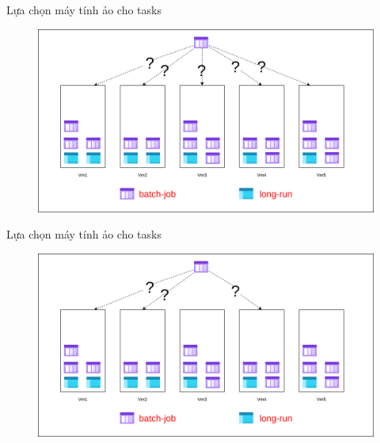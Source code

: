 \documentclass[11pt,xcolor={dvipsnames}, aspectratio=169]{beamer}
\begin{document}
\begin{frame}
{Lựa chọn máy tính ảo cho tasks}
	\begin{figure}
		\vspace{1cm}
		\includegraphics[scale=0.4]{images/balancing_tasks5.png}
	\end{figure}
\end{frame}

\begin{frame}
{Lựa chọn máy tính ảo cho tasks}
	\begin{figure}
		\vspace{1cm}
		\includegraphics[scale=0.4]{images/balancing_tasks6.png}
	\end{figure}
\end{frame}
\end{document}
